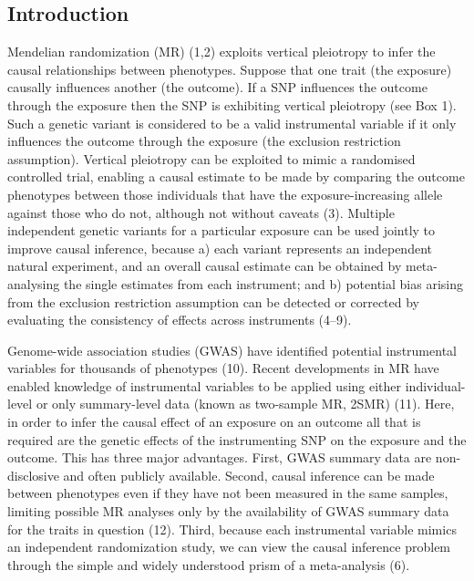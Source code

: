 \documentclass[]{article}
\begin{document}
\subsection{Introduction}\label{introduction}

Mendelian randomization (MR) (1,2) exploits vertical pleiotropy to infer
the causal relationships between phenotypes. Suppose that one trait (the
exposure) causally influences another (the outcome). If a SNP influences
the outcome through the exposure then the SNP is exhibiting vertical
pleiotropy (see Box 1). Such a genetic variant is considered to be a
valid instrumental variable if it only influences the outcome through
the exposure (the exclusion restriction assumption). Vertical pleiotropy
can be exploited to mimic a randomised controlled trial, enabling a
causal estimate to be made by comparing the outcome phenotypes between
those individuals that have the exposure-increasing allele against those
who do not, although not without caveats (3). Multiple independent
genetic variants for a particular exposure can be used jointly to
improve causal inference, because a) each variant represents an
independent natural experiment, and an overall causal estimate can be
obtained by meta-analysing the single estimates from each instrument;
and b) potential bias arising from the exclusion restriction assumption
can be detected or corrected by evaluating the consistency of effects
across instruments (4--9).

Genome-wide association studies (GWAS) have identified potential
instrumental variables for thousands of phenotypes (10). Recent
developments in MR have enabled knowledge of instrumental variables to
be applied using either individual-level or only summary-level data
(known as two-sample MR, 2SMR) (11). Here, in order to infer the causal
effect of an exposure on an outcome all that is required are the genetic
effects of the instrumenting SNP on the exposure and the outcome. This
has three major advantages. First, GWAS summary data are non-disclosive
and often publicly available. Second, causal inference can be made
between phenotypes even if they have not been measured in the same
samples, limiting possible MR analyses only by the availability of GWAS
summary data for the traits in question (12). Third, because each
instrumental variable mimics an independent randomization study, we can
view the causal inference problem through the simple and widely
understood prism of a meta-analysis (6).
\end{document}
